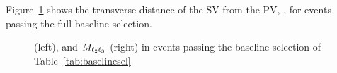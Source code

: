Figure~\ref{fig:reco_displ} shows the transverse
distance of the SV from the PV, \Deltwod, for events
passing the full baseline selection.
\begin{figure}[h]
  \noindent
  \caption{\Deltwod (left), and $M_{\ell_2 \ell_3}$ (right) in events
    passing the baseline selection of Table~\ref{tab:baselinesel}}
  \label{fig:reco_displ}
\end{figure}


